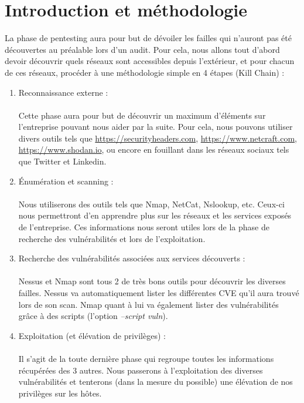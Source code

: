 \documentclass[a4paper]{article}
\begin{document}
\newpage
\section{Introduction et méthodologie}
La phase de pentesting aura pour but de dévoiler les failles qui n'auront pas été découvertes au préalable lors d'un audit. Pour cela, nous allons tout d'abord devoir découvrir quels réseaux sont accessibles depuis l'extérieur, et pour chacun de ces réseaux, procéder à une méthodologie simple en 4 étapes (Kill Chain) : \\
\begin{enumerate}
    \item Reconnaissance externe :\\ \\
    Cette phase aura pour but de découvrir un maximum d'éléments sur l'entreprise pouvant nous aider par la suite. Pour cela, nous pouvons utiliser divers outils tels que \url{https://securityheaders.com}, \url{https://www.netcraft.com}, \url{https://www.shodan.io}, ou encore en fouillant dans les réseaux sociaux tels que Twitter et Linkedin.\\
    \item Énumération et scanning :\\ \\
    Nous utiliserons des outils tels que Nmap, NetCat, Nslookup, etc. Ceux-ci nous permettront d'en apprendre plus sur les réseaux et les services exposés de l'entreprise. Ces informations nous seront utiles lors de la phase de recherche des vulnérabilités et lors de l'exploitation.\\
    \item Recherche des vulnérabilités associées aux services découverts :\\ \\
    Nessus et Nmap sont tous 2 de très bons outils pour découvrir les diverses failles. Nessus va automatiquement lister les différentes CVE qu'il aura trouvé lors de son scan. Nmap quant à lui va également lister des vulnérabilités grâce à des scripts (l'option \emph{--script vuln}).\\
    \item Exploitation (et élévation de privilèges) :\\ \\
    Il s'agit de la toute dernière phase qui regroupe toutes les informations récupérées des 3 autres. Nous passerons à l'exploitation des diverses vulnérabilités et tenterons (dans la mesure du possible) une élévation de nos privilèges sur les hôtes.
\end{enumerate}
\end{document}
